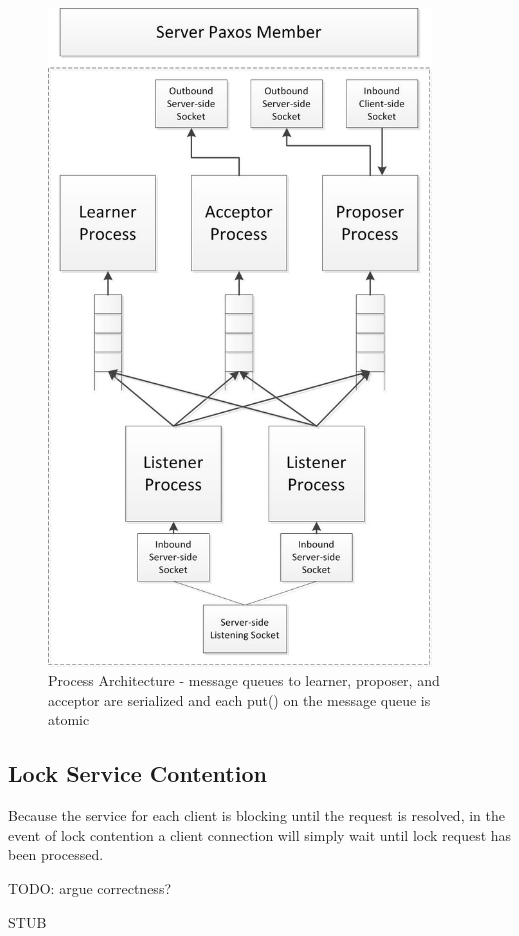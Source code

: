 \documentclass[11pt, onecolumn]{article}
\begin{document}
\begin{figure}
\includegraphics[width=4in]{paxos_member_architecture.jpg}
\caption{Process Architecture - message queues to learner, proposer, and acceptor are serialized and each put() on the message queue is atomic}
\end{figure}


\subsection{Lock Service Contention}

Because the service for each client is blocking until the request is resolved, in the event of lock contention a client connection will simply wait until lock request has been processed.

TODO: argue correctness?

STUB




\end{document}
